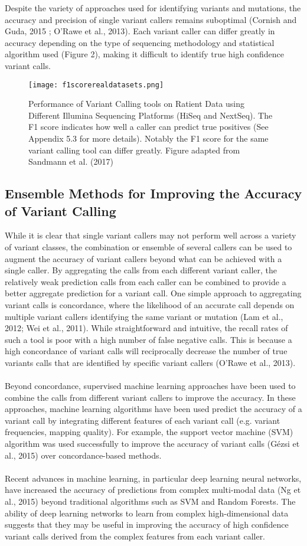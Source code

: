 \documentclass{article}
\begin{document}
Despite the variety of approaches used for identifying variants and mutations,  the accuracy and precision of single variant callers  remains suboptimal (Cornish and Guda, 2015 ; O'Rawe et al., 2013). Each variant caller can differ greatly in accuracy depending on the type of sequencing methodology and statistical algorithm used (Figure 2), making it difficult to identify true high confidence variant calls.
\begin{figure}[H]
\texttt{[image: f1scorerealdatasets.png]}
\centering
\caption{Performance of Variant Calling tools on Ratient Data using  Different Illumina Sequencing Platforms (HiSeq and NextSeq). The F1 score indicates how well a caller can predict true positives (See Appendix 5.3 for more details). Notably the F1 score for the same variant calling tool can differ greatly. Figure adapted from Sandmann et al. (2017)}
\end{figure}
\subsection{Ensemble Methods for Improving the Accuracy of Variant Calling} 
While it is clear that single variant callers may not perform well across a variety of variant classes, the combination or ensemble of several callers can be used to augment the accuracy of variant callers beyond what can be achieved with a single caller. By aggregating the calls from each different variant caller, the relatively weak prediction calls from each caller can be combined to provide a better aggregate prediction for a variant call. 
One simple approach to aggregating variant calls is concordance, where the likelihood of an accurate call depends on multiple variant callers identifying the same variant or mutation (Lam et al., 2012; Wei et al., 2011). While straightforward and intuitive, the recall rates of such a tool is poor with a high number of false negative calls. This is because a high concordance of variant calls will reciprocally decrease the number of true variants calls that are identified by specific variant callers (O'Rawe et al., 2013). \\\\ Beyond concordance, supervised machine learning approaches have been used to combine the calls from different variant callers to improve the accuracy. In these approaches, machine learning algorithms have been used predict the accuracy of a variant call by integrating different features of each variant call (e.g. variant frequencies, mapping quality). For example, the support vector machine (SVM) algorithm was used successfully to improve the accuracy of variant calls (Gézsi et al., 2015) over concordance-based methods. \\\\ Recent advances in machine learning, in particular deep learning neural networks, have increased the accuracy of predictions from complex multi-modal data (Ng et al., 2015) beyond traditional algorithms such as SVM and Random Forests. The ability of deep learning networks  to learn from complex high-dimensional data suggests that they may be useful in improving the accuracy of high confidence variant calls derived from the complex features from each variant caller. 
\end{document}
